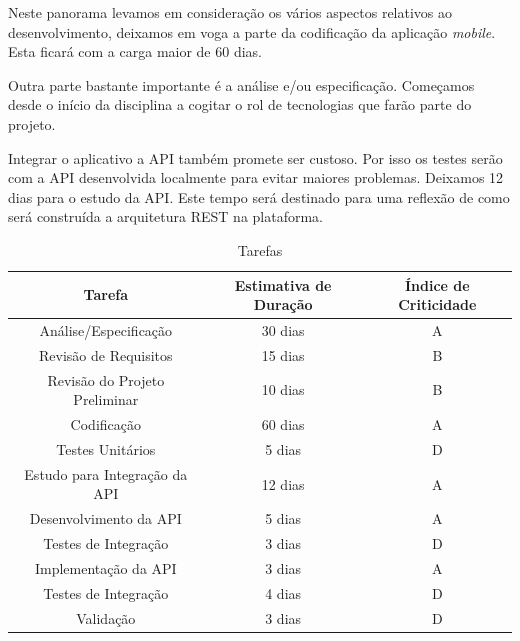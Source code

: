 \documentclass[
	article,			%
	11pt,				%
	oneside,			%
	a4paper,			%
	english,			%
	brazil,				%
	sumario=tradicional
	]{abntex2}
\begin{document}
Neste panorama levamos em consideração os vários aspectos relativos ao desenvolvimento, deixamos em voga a parte da codificação da aplicação \textit{mobile}. Esta ficará com a carga maior de 60 dias.

Outra parte bastante importante é a análise e/ou especificação. Começamos desde o início da disciplina a cogitar o rol de tecnologias que farão parte do projeto.

Integrar o aplicativo a API também promete ser custoso. Por isso os testes serão com a API desenvolvida localmente para evitar maiores problemas. Deixamos 12 dias para o estudo da API. Este tempo será destinado para uma reflexão de como será construída a arquitetura REST na plataforma.

\begin{table}[h]
	\centering
	\caption{Tarefas}
	\label{my-label}
	\begin{tabular}{|c|c|c|}
		\hline
		\textbf{Tarefa}               & \textbf{Estimativa de Duração} & \textbf{Índice de Criticidade} \\ \hline
		Análise/Especificação         & 30 dias                        & A                              \\ \hline
		Revisão de Requisitos         & 15 dias                        & B                              \\ \hline
		Revisão do Projeto Preliminar & 10 dias                        & B                              \\ \hline
		Codificação                   & 60 dias                        & A                              \\ \hline
		Testes Unitários              & 5 dias                         & D                              \\ \hline
		Estudo para Integração da API & 12 dias                        & A                              \\ \hline
		Desenvolvimento da API        & 5 dias                         & A                              \\ \hline
		Testes de Integração          & 3 dias                         & D                              \\ \hline
		Implementação da API          & 3 dias                         & A                              \\ \hline
		Testes de Integração          & 4 dias                         & D                              \\ \hline
		Validação                     & 3 dias                         & D                              \\ \hline
	\end{tabular}
\end{table}
\end{document}
